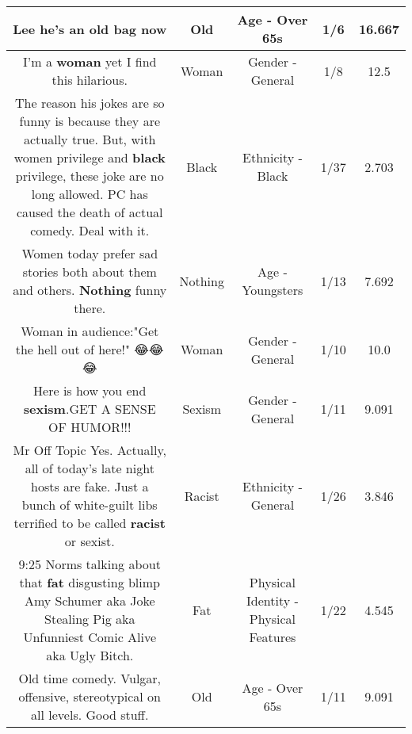 \documentclass[11pt]{article}
\newlength\mylength
\begin{document}
\begin{center}
\begin{longtable}{|C{.65\mylength}|C{.30\mylength}|C{.12\mylength}|C{.12\mylength}|C{.12\mylength}|}
  \small Lee he's an \textbf{old} bag now\normalsize   & Old & Age - Over 65s & 1/6 & 16.667 \\  \hline
  \small I'm a \textbf{woman} yet I find this hilarious.\normalsize   & Woman & Gender - General & 1/8 & 12.5 \\  \hline
  \small The reason his jokes are so funny is because they are actually true.  But, with women privilege and \textbf{black} privilege, these joke are no long allowed.  PC has caused the death of actual comedy.  Deal with it.\normalsize   & Black & Ethnicity - Black & 1/37 & 2.703 \\  \hline
  \small Women today prefer sad stories both about them and others.  \textbf{Nothing} funny there.\normalsize   & Nothing & Age - Youngsters & 1/13 & 7.692 \\  \hline
  \small Woman in audience:"Get the hell out of here!" 😂😂😂\normalsize   & Woman & Gender - General & 1/10 & 10.0 \\  \hline
  \small Here is how you end \textbf{sexism}.GET A SENSE OF HUMOR!!!\normalsize   & Sexism & Gender - General & 1/11 & 9.091 \\  \hline
  \small Mr Off Topic Yes. Actually, all of today's late night hosts are fake. Just a bunch of white-guilt libs terrified to be called \textbf{racist} or sexist.\normalsize   & Racist & Ethnicity - General & 1/26 & 3.846 \\  \hline
  \small \@ 9:25 Norms talking about that \textbf{fat} disgusting blimp Amy Schumer aka Joke Stealing Pig aka Unfunniest Comic Alive aka Ugly Bitch.\normalsize   & Fat & Physical Identity - Physical Features & 1/22 & 4.545 \\  \hline
  \small Old time comedy. Vulgar, offensive, stereotypical on all levels. Good stuff.\normalsize   & Old & Age - Over 65s & 1/11 & 9.091 \\  \hline

\end{longtable}
\end{center}
\end{document}
